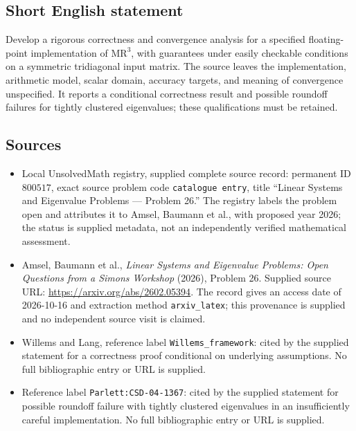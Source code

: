 \documentclass[11pt]{article}
\begin{document}
\subsection{Short English statement}
Develop a rigorous correctness and convergence analysis for a specified floating-point implementation of \(\mathrm{MR}^{3}\), with guarantees under easily checkable conditions on a symmetric tridiagonal input matrix. The source leaves the implementation, arithmetic model, scalar domain, accuracy targets, and meaning of convergence unspecified. It reports a conditional correctness result and possible roundoff failures for tightly clustered eigenvalues; these qualifications must be retained.
\subsection{Sources}
\begin{itemize}
\item Local UnsolvedMath registry, supplied complete source record: permanent ID \(800517\), exact source problem code \texttt{catalogue entry}, title ``Linear Systems and Eigenvalue Problems --- Problem 26.'' The registry labels the problem open and attributes it to Amsel, Baumann et al., with proposed year 2026; the status is supplied metadata, not an independently verified mathematical assessment.
\item Amsel, Baumann et al., \emph{Linear Systems and Eigenvalue Problems: Open Questions from a Simons Workshop} (2026), Problem 26. Supplied source URL: \url{https://arxiv.org/abs/2602.05394}. The record gives an access date of 2026-10-16 and extraction method \texttt{arxiv\_latex}; this provenance is supplied and no independent source visit is claimed.
\item Willems and Lang, reference label \texttt{Willems\_framework}: cited by the supplied statement for a correctness proof conditional on underlying assumptions. No full bibliographic entry or URL is supplied.
\item Reference label \texttt{Parlett:CSD-04-1367}: cited by the supplied statement for possible roundoff failure with tightly clustered eigenvalues in an insufficiently careful implementation. No full bibliographic entry or URL is supplied.
\end{itemize}
\end{document}
